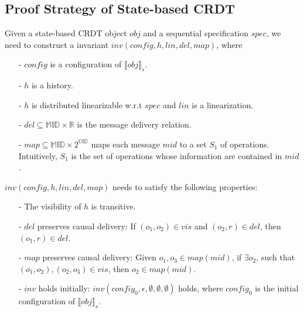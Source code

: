 {\subsection{Proof Strategy of State-based CRDT}
\label{subsec:proof strategy of operation-based CRDT}

Given a state-based CRDT object $\mathit{obj}$ and a sequential specification $\mathit{spec}$, we need to construct a invariant $\mathit{inv}(\mathit{config},h,\mathit{lin},\mathit{del},\mathit{map})$, where

\begin{itemize}
\setlength{\itemsep}{0.5pt}
\item[-] $\mathit{config}$ is a configuration of $\llbracket \mathit{obj} \rrbracket_s$.

\item[-] $h$ is a history.

\item[-] $h$ is distributed linearizable w.r.t $\mathit{spec}$ and $\mathit{lin}$ is a linearization.

\item[-] $\mathit{del} \subseteq \mathbb{MID} \times \mathbb{R}$ is the message delivery relation.

\item[-] $\mathit{map} \subseteq \mathbb{MID} \times 2^{\mathbb{OID}}$ maps each message $\mathit{mid}$ to a set $S_1$ of operations. Intuitively, $S_1$ is the set of operations whose information are contained in $\mathit{mid}$.
\end{itemize}

$\mathit{inv}(\mathit{config},h,\mathit{lin},\mathit{del},\mathit{map})$ needs to satisfy the following properties:

\begin{itemize}
\setlength{\itemsep}{0.5pt}
\item[-] The visibility of $h$ is transitive.

\item[-] $\mathit{del}$ preserves causal delivery: If $(o_1,o_2) \in \mathit{vis}$ and $(o_2,r) \in \mathit{del}$, then $(o_1,r) \in \mathit{del}$.

\item[-] $\mathit{map}$ preserves causal delivery: Given $o_1,o_3 \in \mathit{map}(\mathit{mid})$, if $\exists o_2$, such that $(o_1,o_2),(o_2,o_3) \in \mathit{vis}$, then $o_2 \in \mathit{map}(\mathit{mid})$.

\item[-] $\mathit{inv}$ holds initially: $\mathit{inv}(\mathit{config}_0,\epsilon,\emptyset,\emptyset,\emptyset)$ holds, where $\mathit{config}_0$ is the initial configuration of $\llbracket \mathit{obj} \rrbracket_s$.


\end{itemize}}
